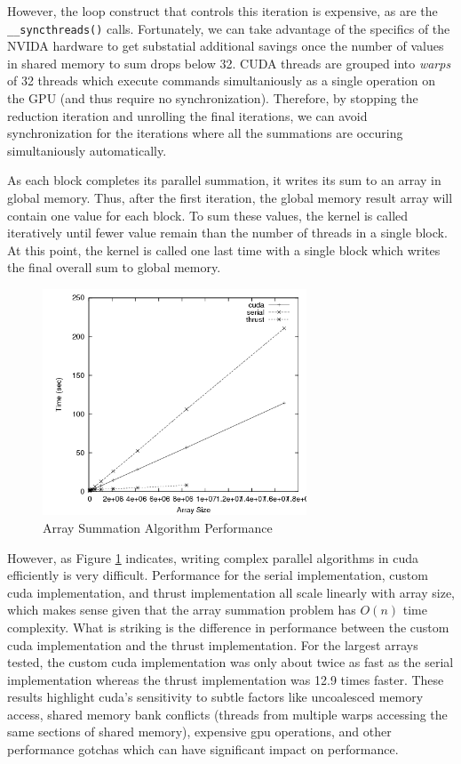 \documentclass{article}
\begin{document}
However, the loop construct that controls this iteration is expensive, as are the \verb!__syncthreads()! calls. Fortunately, we can take advantage of the specifics of the NVIDA hardware to get substatial additional savings once the number of values in shared memory to sum drops below 32. CUDA threads are grouped into \emph{warps} of 32 threads which execute commands simultaniously as a single operation on the GPU (and thus require no synchronization). Therefore, by stopping the reduction iteration and unrolling the final iterations, we can avoid synchronization for the iterations where all the summations are occuring simultaniously automatically.

As each block completes its parallel summation, it writes its sum to an array in global memory. Thus, after the first iteration, the global memory result array will contain one value for each block. To sum these values, the kernel is called iteratively until fewer value remain than the number of threads in a single block. At this point, the kernel is called one last time with a single block which writes the final overall sum to global memory.

\begin{figure}
\centering
\includegraphics[width=0.7\textwidth]{data/summation_plot.png}
\caption{Array Summation Algorithm Performance}
\label{summation_plot}
\end{figure}

However, as Figure \ref{summation_plot} indicates, writing complex parallel algorithms in cuda efficiently is very difficult. Performance for the serial implementation, custom cuda implementation, and thrust implementation all scale linearly with array size, which makes sense given that the array summation problem has \(O(n)\) time complexity. What is striking is the difference in performance between the custom cuda implementation and the thrust implementation. For the largest arrays tested, the custom cuda implementation was only about twice as fast as the serial implementation whereas the thrust implementation was 12.9 times faster. These results highlight cuda's sensitivity to subtle factors like uncoalesced memory access, shared memory bank conflicts (threads from multiple warps accessing the same sections of shared memory), expensive gpu operations, and other performance gotchas which can have significant impact on performance\cite{bestprac}.
\end{document}

